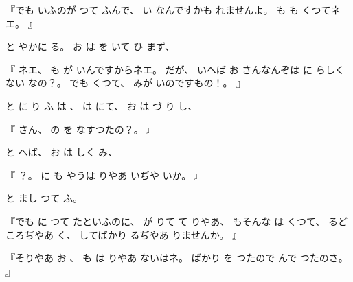 %
『でも
いふのが
つて
ふんで、
%
い
なんですかも
れませんよ。
%
も
も
くつてネエ。
』

%
と
やかに
る。
%
お
は
を
いて
ひ
まず、

%
『
ネエ、
%
も
が
いんですからネエ。
%
だが、
%
いへば
お
さんなんぞは
に
らしくない
なの？。
%
でも
くつて、
%
みが
いのですもの！。
』

%
と
に
り
ふ
は
、
%
は
にて、
%
お
は
づ
り
し、

%
『
さん、
%
の
を
なすつたの？。
』

%
と
へば、
%
お
は
しく
み、

%
『
？。
%
に
も
やうは
りやあ
いぢや
いか。
』

%
と
まし
つて
ふ。

%
『でも
に
つて
たといふのに、
%
が
りて
て
りやあ、
%
もそんな
は
くつて、
%
るどころぢやあ
く、
%
してばかり
るぢやあ
りませんか。
』

%
『そりやあ
お
、
%
も
は
りやあ
ないはネ。
%
ばかり
を
つたので
んで
つたのさ。
』

